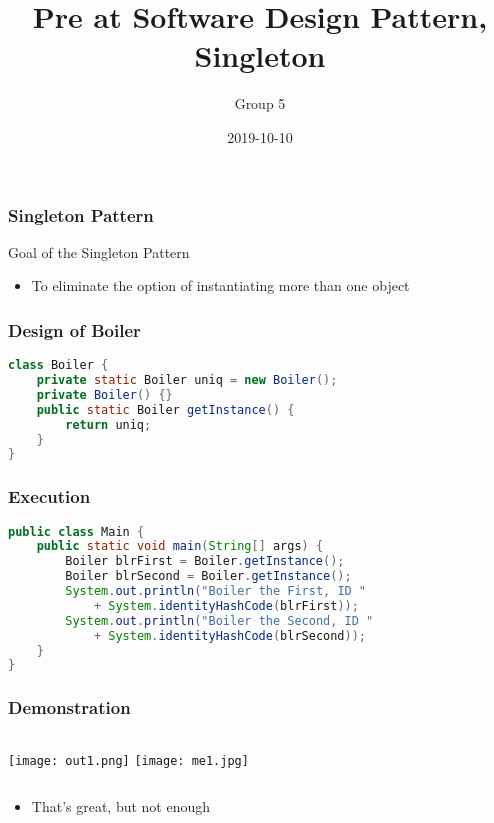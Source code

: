 \documentclass{beamer}
\title{Pre at Software Design Pattern, Singleton}
\author{Group 5}
\date{2019-10-10}
\begin{document}
\maketitle

\begin{frame}
    \frametitle{Singleton Pattern}

    Goal of the Singleton Pattern

    \begin{itemize}
        \item To eliminate the option of instantiating more than one object
    \end{itemize}
\end{frame}

\begin{frame}[fragile]
\frametitle{Design of Boiler}
\begin{lstlisting}[language=java]
class Boiler {
    private static Boiler uniq = new Boiler();
    private Boiler() {}
    public static Boiler getInstance() {
        return uniq;
    }
}
\end{lstlisting}
\end{frame}

\begin{frame}[fragile]
\frametitle{Execution}
\begin{small}
\begin{lstlisting}[language=java]
public class Main {
    public static void main(String[] args) {
        Boiler blrFirst = Boiler.getInstance();
        Boiler blrSecond = Boiler.getInstance();
        System.out.println("Boiler the First, ID "
            + System.identityHashCode(blrFirst));
        System.out.println("Boiler the Second, ID "
            + System.identityHashCode(blrSecond));
    }
}
\end{lstlisting}
\end{small}
\end{frame}

\begin{frame}
\frametitle{Demonstration}
\begin{columns}
\column{ 3.5in }
\texttt{[image: out1.png]}
\column{ 2.0in }
\texttt{[image: me1.jpg]}
\end{columns}
\begin{itemize}
    \item That's great, but not enough
\end{itemize}
\end{frame}
\end{document}
